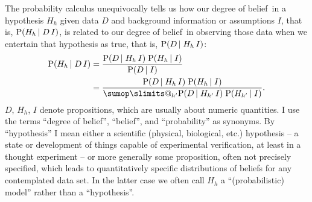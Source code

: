 \documentclass[\ifafour a4paper,12pt,\else a5paper,10pt,\fi%
onecolumn,oneside,article,%
british%
]{memoir}
\makeatletter
\theoremstyle{remark}
\theoremstyle{innote}
\newtheorem*{innote}{}
\def\sum{\DOTSI\sumop\slimits@}
\newcommand*{\limplies}{\mathbin{\Rightarrow}}%
\newcommand*{\pf}{\mathrm{p}}%
\newcommand*{\p}{\mathrm{P}}%
\renewcommand*{\|}[1][]{\nonscript\,#1\vert\nonscript\;\mathopen{}}
\newcommand*{\etc}{{etc.}}
\newcommand*{\dob}{degree of belief}
\newcommand*{\yK}{I}
\makeatother
\begin{document}
The probability calculus unequivocally tells us how our \dob\ in a
hypothesis $H_{h}$ given data $D$ and background information or assumptions
$\yK$, that is, $\p(H_{h} \| D \, \yK)$, is related to our \dob\ in
observing those data when we entertain that hypothesis as true, that is,
$\p(D \| H_{h} \, \yK)$:
\begin{subequations}
    \label{eq:posterior_hypothesis}
  \begin{align}
    \label{eq:posterior_hypothesis_universal}
    \p(H_{h} \| D \, \yK) &=
    \frac{\p(D \| H_{h} \, \yK)\;\p(H_{h} \| \yK)}{\p(D \| \yK)}\\
    \label{eq:posterior_hypothesis_sethypotheses}
    &=\frac{\p(D \| H_{h} \, \yK)\;\p(H_{h} \| \yK)}{\sum_{h'} \p(D \| H_{h'} \, \yK)\; \p(H_{h'} \| \yK)}.
  \end{align}
\end{subequations}
$D$, $H_{h}$, $\yK$ denote propositions, which are usually about
numeric quantities. I use the terms \enquote{\dob}, \enquote{belief}, and
\enquote{probability} as synonyms. By \enquote{hypothesis} I mean either a
scientific (physical, biological, \etc) hypothesis -- a state or
development of things capable of experimental verification, at least in a
thought experiment -- or more generally some proposition, often not
precisely specified, which leads to quantitatively specific distributions
of beliefs for any contemplated data set.
In the latter case we often call $H_{h}$  a
\enquote{(probabilistic) model} rather than a \enquote{hypothesis}.
  
\end{document}
